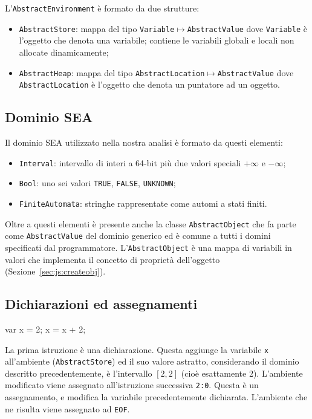 L'\texttt{AbstractEnvironment} è formato da due strutture:
\begin{itemize}
    \item \texttt{AbstractStore}: mappa del tipo \texttt{Variable}$\mapsto$\texttt{AbstractValue} dove \texttt{Variable} è l'oggetto che denota una variabile; contiene le variabili globali e locali non allocate dinamicamente;
    \item \texttt{AbstractHeap}: mappa del tipo \texttt{AbstractLocation}$\mapsto$\texttt{AbstractValue} dove \texttt{AbstractLocation} è l'oggetto che denota un puntatore ad un oggetto.
\end{itemize}

\subsection{Dominio SEA}

Il dominio SEA utilizzato nella nostra analisi è formato da questi elementi:
\begin{itemize}
    \item \texttt{Interval}: intervallo di interi a 64-bit più due valori speciali $+\infty$ e $-\infty$;
    \item \texttt{Bool}: uno sei valori \texttt{TRUE}, \texttt{FALSE}, \texttt{UNKNOWN};
    \item \texttt{FiniteAutomata}: stringhe rappresentate come automi a stati finiti.
\end{itemize}
Oltre a questi elementi è presente anche la classe \texttt{AbstractObject} che fa parte come \texttt{AbstractValue} del dominio generico ed è comune a tutti i domini specificati dal programmatore. L'\texttt{AbstractObject} è una mappa di variabili in valori che implementa il concetto di proprietà dell'oggetto (Sezione~\ref{sec:js:createobj}). 

\subsection{Dichiarazioni ed assegnamenti}\label{sec:realizzazione:dichiarazioni}
\begin{javascriptcode}
var x = 2;
x = x + 2;
\end{javascriptcode}
La prima istruzione è una dichiarazione. Questa aggiunge la variabile \texttt{x} all'ambiente (\texttt{AbstractStore}) ed il suo valore astratto, considerando il dominio descritto precedentemente, è l'intervallo $[2,2]$ (cioè esattamente 2). L'ambiente modificato viene assegnato all'istruzione successiva \texttt{2:0}. Questa è un assegnamento, e modifica la variabile precedentemente dichiarata. L'ambiente che ne risulta viene assegnato ad \texttt{EOF}. 

